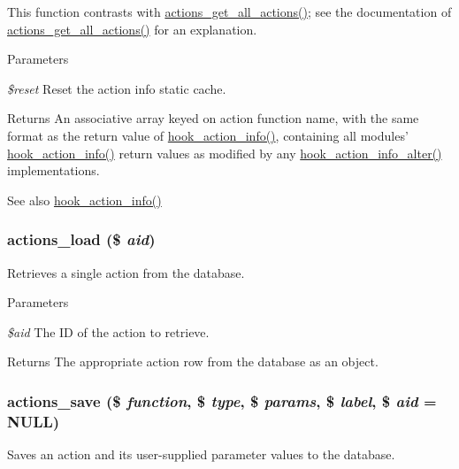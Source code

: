 This function contrasts with \hyperlink{actions_8inc_a4275e9fee609ba6e85b03278a681436c}{actions\_\-get\_\-all\_\-actions()}; see the documentation of \hyperlink{actions_8inc_a4275e9fee609ba6e85b03278a681436c}{actions\_\-get\_\-all\_\-actions()} for an explanation.


\begin{DoxyParams}{Parameters}
\item[{\em \$reset}]Reset the action info static cache.\end{DoxyParams}
\begin{DoxyReturn}{Returns}
An associative array keyed on action function name, with the same format as the return value of \hyperlink{group__actions_ga3df26c5d6496c91fcd0edd8648023fb4}{hook\_\-action\_\-info()}, containing all modules' \hyperlink{group__actions_ga3df26c5d6496c91fcd0edd8648023fb4}{hook\_\-action\_\-info()} return values as modified by any \hyperlink{group__hooks_ga141677d430a340c375bea9e1098a7a82}{hook\_\-action\_\-info\_\-alter()} implementations.
\end{DoxyReturn}
\begin{DoxySeeAlso}{See also}
\hyperlink{group__actions_ga3df26c5d6496c91fcd0edd8648023fb4}{hook\_\-action\_\-info()} 
\end{DoxySeeAlso}
\hypertarget{actions_8inc_a1e953639945d342b20fe51b8d21095cc}{
\subsubsection[{actions\_\-load}]{\setlength{\rightskip}{0pt plus 5cm}actions\_\-load (\$ {\em aid})}}
\label{actions_8inc_a1e953639945d342b20fe51b8d21095cc}
Retrieves a single action from the database.


\begin{DoxyParams}{Parameters}
\item[{\em \$aid}]The ID of the action to retrieve.\end{DoxyParams}
\begin{DoxyReturn}{Returns}
The appropriate action row from the database as an object. 
\end{DoxyReturn}
\hypertarget{actions_8inc_ad57cade4c548a0d8fe2e6902d7292ad8}{
\subsubsection[{actions\_\-save}]{\setlength{\rightskip}{0pt plus 5cm}actions\_\-save (\$ {\em function}, \/  \$ {\em type}, \/  \$ {\em params}, \/  \$ {\em label}, \/  \$ {\em aid} = {\ttfamily NULL})}}
\label{actions_8inc_ad57cade4c548a0d8fe2e6902d7292ad8}
Saves an action and its user-\/supplied parameter values to the database.


